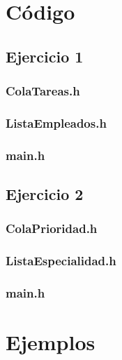 \documentclass[a4paper,12pt]{article}
\begin{document}
 \section{Código}
 
 \subsection{Ejercicio 1}
 \subsubsection{ColaTareas.h}
  
 \subsubsection{ListaEmpleados.h}
  
 \subsubsection{main.h}
  
  \newpage
 \subsection{Ejercicio 2}
 \subsubsection{ColaPrioridad.h}
  
 \subsubsection{ListaEspecialidad.h}
  
 \subsubsection{main.h}
  
 \onecolumn

 \section{Ejemplos}
\end{document}
